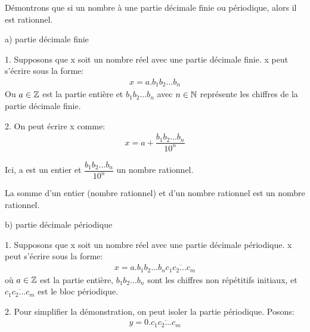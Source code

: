 \documentclass[a4paper, 12pt]{article}
\begin{document}
\begin{demonstration}
    Démontrons que si un nombre à une partie décimale finie ou périodique, alors il est rationnel.

    \vspace{1em}

    a) partie décimale finie

    \vspace{0.5em}

    1. Supposons que x soit un nombre réel avec une partie décimale finie.
    x peut s'écrire sous la forme:
    \begin{align*}
        x = a.b_1b_2...b_n
    \end{align*}
    Ou $a \in \mathbb{Z}$ est la partie entière et $b_1b_2...b_n$ avec $n \in \mathbb{N}$ représente les chiffres de la partie décimale finie.
    
    \vspace{0.5em}

    2. On peut écrire x comme:
    \begin{align*}
        x = a + \dfrac{b_1b_2...b_n}{10^n}
    \end{align*}

    Ici, a est un entier et $\dfrac{b_1b_2...b_n}{10^n}$ un nombre rationnel.

    \begin{rdem}
        La somme d'un entier (nombre rationnel) et d'un nombre rationnel est un nombre rationnel.
    \end{rdem}

    \vspace{1em}

    b) partie décimale périodique

    \vspace{0.5em}

    1. Supposons que x soit un nombre réel avec une partie décimale périodique.
    x peut s'écrire sous la forme:
    \begin{align*}
        x = a.b_1b_2...b_n\overline{c_1c_2...c_m}
    \end{align*}
    où $a \in \mathbb{Z}$ est la partie entière, $b_1b_2...b_n$ sont les chiffres non répétitifs initiaux, et
    $\overline{c_1c_2...c_m}$ est le bloc périodique.

    \vspace{0.5em}

    2. Pour simplifier la démonstration, on peut isoler la partie périodique. Posons:
    \begin{align*}
        y = 0.\overline{c_1c_2...c_m}
    \end{align*}
    \vspace{0.5em}
    

\end{demonstration}
\end{document}
